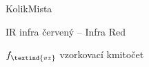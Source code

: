 \begin{seznamzkratek}{KolikMista}

    {IR}
    {infra červený -- Infra Red}

    {\ensuremath{f_\textind{vz}}}
    {vzorkovací kmitočet}

\end{seznamzkratek}
